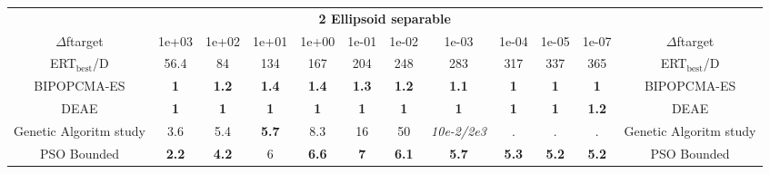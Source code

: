 \begin{tabular}{cccccccccccc}
 & \multicolumn{10}{c}{{\normalsize \textbf{2 Ellipsoid separable}}}\\
$\Delta$ftarget& 1e+03& 1e+02& 1e+01& 1e+00& 1e-01& 1e-02& 1e-03& 1e-04& 1e-05& 1e-07 & $\Delta$ftarget \\
ERT$_{\textrm{best}}$/D& 56.4& 84& 134& 167& 204& 248& 283& 317& 337& 365 & ERT$_{\textrm{best}}$/D \\
\hline
BIPOPCMA-ES & \textbf{1} & \textbf{1.2} & \textbf{1.4} & \textbf{1.4} & \textbf{1.3} & \textbf{1.2} & \textbf{1.1} & \textbf{1} & \textbf{1} & \textbf{1} & BIPOPCMA-ES \cite{add_an_entry_for_BIPOPCMA-ES_in_bbob.bib}\\
DEAE & \textbf{1} & \textbf{1} & \textbf{1} & \textbf{1} & \textbf{1} & \textbf{1} & \textbf{1} & \textbf{1} & \textbf{1} & \textbf{1.2} & DEAE \cite{add_an_entry_for_DEAE_in_bbob.bib}\\
Genetic Algoritm study & 3.6 & 5.4 & \textbf{5.7} & 8.3 & 16 & 50 & \textit{10e-2}\textit{/2e3} & . & . & . & Genetic Algoritm study \cite{add_an_entry_for_Genetic Algoritm study_in_bbob.bib}\\
PSO Bounded & \textbf{2.2} & \textbf{4.2} & 6 & \textbf{6.6} & \textbf{7} & \textbf{6.1} & \textbf{5.7} & \textbf{5.3} & \textbf{5.2} & \textbf{5.2} & PSO Bounded \cite{add_an_entry_for_PSO Bounded_in_bbob.bib}
\end{tabular}
